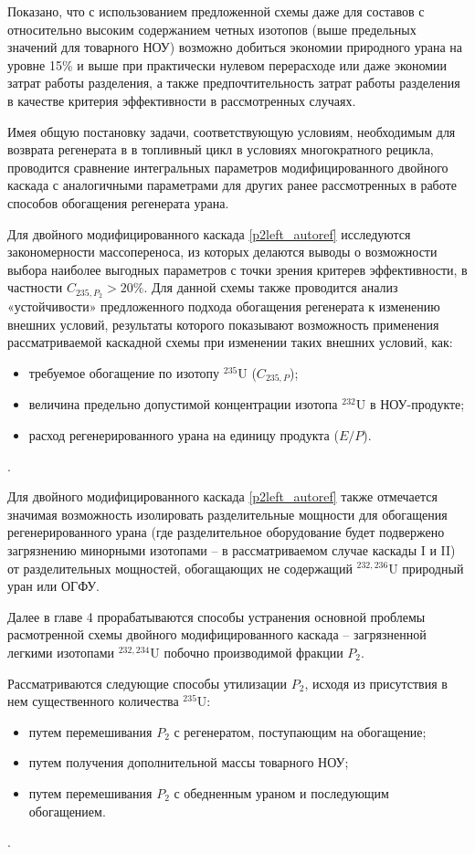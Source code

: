 Показано, что с использованием предложенной схемы даже для составов с относительно высоким содержанием четных изото­пов (выше предельных значений для товарного НОУ) возможно добиться экономии природного урана на уровне 15\% и выше при практически нулевом перерасходе или даже экономии затрат работы разделения, а также предпочтительность затрат работы разделения в качестве критерия эффективности в рассмотренных случаях.

Имея общую постановку задачи, соответствующую условиям, необходимым для возврата регенерата в в топливный цикл в условиях многократного рецикла, проводится сравнение интегральных параметров модифицированного двойного каскада с аналогичными параметрами для других ранее рассмотренных в работе способов обогащения регенерата урана.

Для двойного модифицированного каскада \ref{p2left_autoref} исследуются закономерности массопереноса, из которых делаются выводы о возможности выбора наиболее выгодных параметров с точки зрения критерев эффективности, в частности $C_{235,{P_2}} > 20\%$. Для данной схемы также проводится анализ «устойчивости» предложенного подхода обогащения регенерата к изменению внешних условий, результаты которого показывают возможность применения рассматриваемой каскадной схемы при изменении таких внешних условий, как:
\begin{itemize}
  \item требуемое обогащение по изотопу $^{235}$U ($C_{235,P}$);    
  \item величина предельно допустимой концентрации изотопа $^{232}$U в НОУ-продукте;
  \item расход регенерированного урана на единицу продукта ($E/P$).
\end{itemize}.

Для двойного модифицированного каскада \ref{p2left_autoref} также отмечается значимая возможность изолировать разделительные мощности для обогащения регенерированного урана (где разделительное оборудование будет подвержено загрязнению минорными изотопами -- в рассматриваемом случае каскады I и II) от разделительных мощностей, обогащающих не содержащий $^{232,236}$U природный уран или ОГФУ.

Далее в главе 4 прорабатываются способы устранения основной проблемы расмотренной схемы двойного модифицированного каскада -- загрязненной легкими изотопами $^{232,234}$U побочно производимой фракции $P_2$.

Рассматриваются следующие способы утилизации $P_2$, исходя из присутствия в нем существенного количества $^{235}$U:
\begin{itemize}
  \item путем перемешивания $P_2$ с регенератом, поступающим на обогащение;
  \item путем получения дополнительной массы товарного НОУ;
  \item путем перемешивания $P_2$ с обедненным ураном и последующим обогащением.
\end{itemize}.


